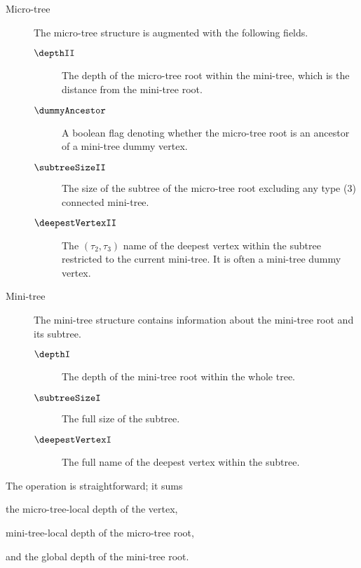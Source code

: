 \begin{description}
	\item[Micro-tree]
	The micro-tree structure is augmented with the following fields.
	\begin{description}
		\item[$\depthII$]
		The depth of the micro-tree root within the mini-tree, which is the distance from the mini-tree root.
		
		\item[$\dummyAncestor$]
		A boolean flag denoting whether the micro-tree root is an ancestor of a mini-tree dummy vertex.
		
		\item[$\subtreeSizeII$]
		The size of the subtree of the micro-tree root excluding any type (3) connected mini-tree.
		
		\item[$\deepestVertexII$]
		The $(\tau_2, \tau_3)$ name of the deepest vertex within the subtree restricted to the current mini-tree.
		It is often a mini-tree dummy vertex.
	\end{description}
	
	\item[Mini-tree]
	The mini-tree structure contains information about the mini-tree root and its subtree.
	\begin{description}
		\item[$\depthI$] 
		The depth of the mini-tree root within the whole tree.
		
		\item[$\subtreeSizeI$]
		The full size of the subtree.
		
		\item[$\deepestVertexI$]
		The full name of the deepest vertex within the subtree.
	\end{description}
\end{description}

The operation \dep{} is straightforward; it sums
\begin{iteminline}
	\item the micro-tree-local depth of the vertex,
	\item mini-tree-local depth of the micro-tree root,
	\item and the global depth of the mini-tree root.
\end{iteminline}

\begin{algorithm}
\begin{algorithmic}
		\State {}
		\State {}
	\Else
		\State {}
	\EndIf
\EndFunction
\end{algorithmic}
\end{algorithm}

